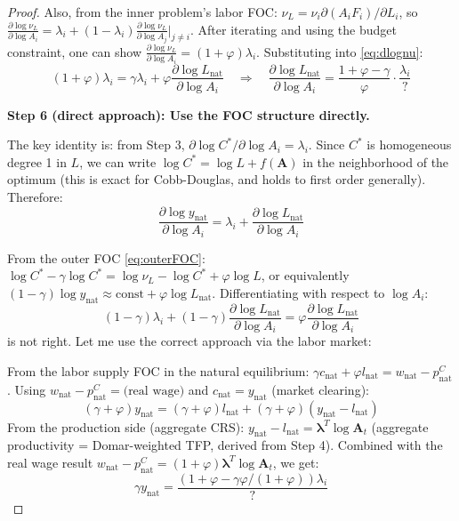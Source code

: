 \documentclass[12pt]{article}
\begin{document}
\begin{proof}
Also, from the inner problem's labor FOC: $\nu_L = \nu_i \partial(A_i F_i)/\partial L_i$, so $\frac{\partial \log \nu_L}{\partial \log A_i} = \lambda_i + (1-\lambda_i)\frac{\partial \log \nu_L}{\partial \log A_j}\big|_{j\neq i}$. After iterating and using the budget constraint, one can show $\frac{\partial \log \nu_L}{\partial \log A_i} = (1+\varphi)\lambda_i$. Substituting into \eqref{eq:dlognu}:
\begin{equation}
    (1+\varphi)\lambda_i = \gamma\lambda_i + \varphi\frac{\partial \log L_{\mathrm{nat}}}{\partial \log A_i}
    \quad \Rightarrow \quad
    \frac{\partial \log L_{\mathrm{nat}}}{\partial \log A_i} = \frac{1+\varphi-\gamma}{\varphi}\cdot\frac{\lambda_i}{?}
\end{equation}

\medskip
\textbf{Step 6 (direct approach): Use the FOC structure directly.}

The key identity is: from Step 3, $\partial \log C^*/\partial \log A_i = \lambda_i$. Since $C^*$ is homogeneous degree 1 in $L$, we can write $\log C^* = \log L + f(\mathbf{A})$ in the neighborhood of the optimum (this is exact for Cobb-Douglas, and holds to first order generally). Therefore:
\begin{equation}
    \frac{\partial \log y_{\mathrm{nat}}}{\partial \log A_i} = \lambda_i + \frac{\partial \log L_{\mathrm{nat}}}{\partial \log A_i}
    \label{eq:dyny}
\end{equation}

From the outer FOC \eqref{eq:outerFOC}: $\log C^* - \gamma \log C^* = \log \nu_L - \log C^* + \varphi \log L$, or equivalently $(1-\gamma)\log y_{\mathrm{nat}} \approx \text{const} + \varphi \log L_{\mathrm{nat}}$. Differentiating with respect to $\log A_i$:
\begin{equation}
    (1-\gamma)\lambda_i + (1-\gamma)\frac{\partial \log L_{\mathrm{nat}}}{\partial \log A_i} = \varphi\frac{\partial \log L_{\mathrm{nat}}}{\partial \log A_i}
\end{equation}
is not right. Let me use the correct approach via the labor market:

From the labor supply FOC in the natural equilibrium: $\gamma c_{\mathrm{nat}} + \varphi l_{\mathrm{nat}} = w_{\mathrm{nat}} - p_{\mathrm{nat}}^C$. Using $w_{\mathrm{nat}} - p_{\mathrm{nat}}^C = \text{(real wage)}$ and $c_{\mathrm{nat}} = y_{\mathrm{nat}}$ (market clearing):
\begin{equation}
    (\gamma+\varphi) y_{\mathrm{nat}} = (\gamma+\varphi) l_{\mathrm{nat}} + (\gamma+\varphi)(y_{\mathrm{nat}} - l_{\mathrm{nat}})
\end{equation}
From the production side (aggregate CRS): $y_{\mathrm{nat}} - l_{\mathrm{nat}} = \bm{\lambda}^T \log \mathbf{A}_t$ (aggregate productivity = Domar-weighted TFP, derived from Step 4). Combined with the real wage result $w_{\mathrm{nat}} - p_{\mathrm{nat}}^C = (1+\varphi)\bm{\lambda}^T\log\mathbf{A}_t$, we get:
\begin{equation}
    \gamma y_{\mathrm{nat}} = \frac{(1+\varphi - \gamma\varphi/(1+\varphi))\lambda_i}{?}
\end{equation}


\end{proof}
\end{document}
